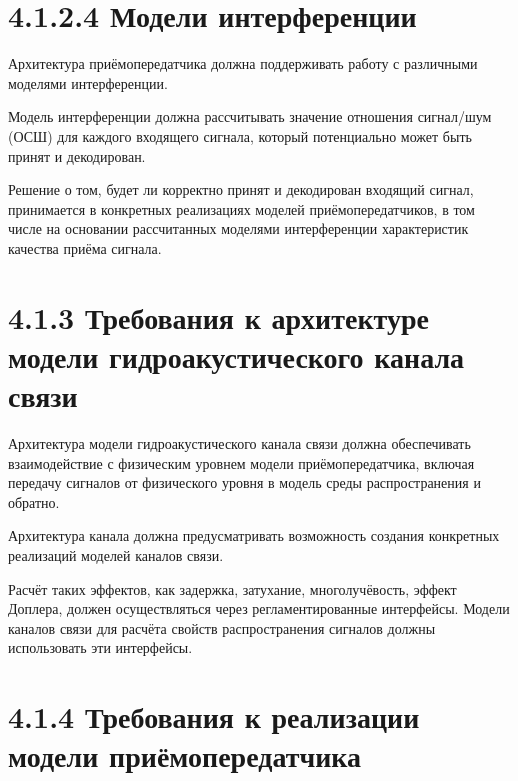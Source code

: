 \section{4.1.2.4 Модели
интерференции}\label{ux43cux43eux434ux435ux43bux438-ux438ux43dux442ux435ux440ux444ux435ux440ux435ux43dux446ux438ux438}

Архитектура приёмопередатчика должна поддерживать работу с различными
моделями интерференции.

Модель интерференции должна рассчитывать значение отношения сигнал/шум
(ОСШ) для каждого входящего сигнала, который потенциально может быть
принят и декодирован.

Решение о том, будет ли корректно принят и декодирован входящий сигнал,
принимается в конкретных реализациях моделей приёмопередатчиков, в том
числе на основании рассчитанных моделями интерференции характеристик
качества приёма сигнала.

\section{4.1.3 Требования к архитектуре модели гидроакустического канала
связи}\label{ux442ux440ux435ux431ux43eux432ux430ux43dux438ux44f-ux43a-ux430ux440ux445ux438ux442ux435ux43aux442ux443ux440ux435-ux43cux43eux434ux435ux43bux438-ux433ux438ux434ux440ux43eux430ux43aux443ux441ux442ux438ux447ux435ux441ux43aux43eux433ux43e-ux43aux430ux43dux430ux43bux430-ux441ux432ux44fux437ux438}

Архитектура модели гидроакустического канала связи должна обеспечивать
взаимодействие с физическим уровнем модели приёмопередатчика, включая
передачу сигналов от физического уровня в модель среды распространения и
обратно.

Архитектура канала должна предусматривать возможность создания
конкретных реализаций моделей каналов связи.

Расчёт таких эффектов, как задержка, затухание, многолучёвость, эффект
Доплера, должен осуществляться через регламентированные интерфейсы.
Модели каналов связи для расчёта свойств распространения сигналов должны
использовать эти интерфейсы.\hl{}

\hl{}

\section{4.1.4 Требования к реализации модели
приёмопередатчика}\label{ux442ux440ux435ux431ux43eux432ux430ux43dux438ux44f-ux43a-ux440ux435ux430ux43bux438ux437ux430ux446ux438ux438-ux43cux43eux434ux435ux43bux438-ux43fux440ux438ux451ux43cux43eux43fux435ux440ux435ux434ux430ux442ux447ux438ux43aux430}

